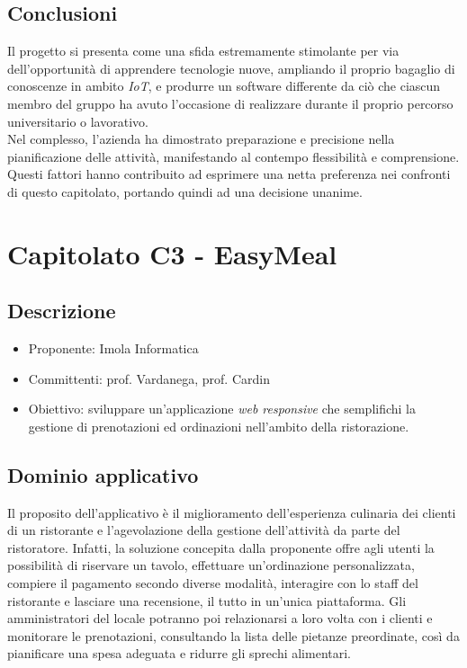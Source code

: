 \subsection{Conclusioni}
Il progetto si presenta come una sfida estremamente stimolante per via dell'opportunità di apprendere tecnologie nuove, ampliando il proprio bagaglio di conoscenze in ambito \textit{IoT}, e produrre un software differente da ciò che ciascun membro del gruppo ha avuto l'occasione di realizzare durante il proprio percorso universitario o lavorativo. \\ Nel complesso, l'azienda ha dimostrato preparazione e precisione nella pianificazione delle attività, manifestando al contempo flessibilità e comprensione. \\ Questi fattori hanno contribuito ad esprimere una netta preferenza nei confronti di questo capitolato, portando quindi ad una decisione unanime.

\newpage

\section{Capitolato C3 - EasyMeal}
\subsection{Descrizione}
\begin{itemize}
    \setlength\itemsep{0em}
    \item Proponente: Imola Informatica
    \item Committenti: prof. Vardanega, prof. Cardin
    \item Obiettivo: sviluppare un'applicazione \textit{web responsive} che semplifichi la gestione di prenotazioni ed ordinazioni nell'ambito della ristorazione.
\end{itemize}

\subsection{Dominio applicativo}
Il proposito dell'applicativo è il miglioramento dell'esperienza culinaria dei clienti di un ristorante e l'agevolazione della gestione dell'attività da parte del ristoratore. Infatti, la soluzione concepita dalla proponente offre agli utenti la possibilità di riservare un tavolo, effettuare un'ordinazione personalizzata, compiere il pagamento secondo diverse modalità, interagire con lo staff del ristorante e lasciare una recensione, il tutto in un'unica piattaforma. Gli amministratori del locale potranno poi relazionarsi a loro volta con i clienti e monitorare le prenotazioni, consultando la lista delle pietanze preordinate, così da pianificare una spesa adeguata e ridurre gli sprechi alimentari.

